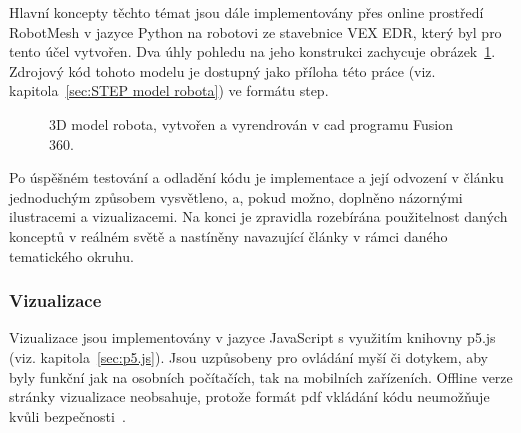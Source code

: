 \documentclass[a4paper, 12pt, twoside]{article}
\begin{document}
  Hlavní koncepty těchto témat jsou dále implementovány přes online prostředí RobotMesh v jazyce Python na robotovi ze stavebnice VEX EDR, který byl pro tento účel vytvořen. Dva úhly pohledu na jeho konstrukci zachycuje obrázek~\ref{img:3D model robota}. Zdrojový kód tohoto modelu je dostupný jako příloha této práce (viz. kapitola~\ref{sec:STEP model robota}) ve formátu \gls{step}.

  \begin{figure}[H]%
    \centering

    \hfill

    \caption[3D model robota]{3D model robota, vytvořen a vyrendrován v \gls{cad} programu Fusion 360.}%
    \label{img:3D model robota}%
  \end{figure}

  Po úspěšném testování a odladění kódu je implementace a její odvození v článku jednoduchým způsobem vysvětleno, a, pokud možno, doplněno názornými ilustracemi a vizualizacemi. Na konci je zpravidla rozebírána použitelnost daných konceptů v reálném světě a nastíněny navazující články v rámci daného tematického okruhu.


  \subsubsection{Vizualizace} \label{sec:Vizualizace}
  Vizualizace jsou implementovány v jazyce JavaScript s využitím knihovny p5.js (viz. kapitola~\ref{sec:p5.js}). Jsou uzpůsobeny pro ovládání myší či dotykem, aby byly funkční jak na osobních počítačích, tak na mobilních zařízeních. Offline verze stránky vizualizace neobsahuje, protože formát \gls{pdf} vkládání kódu neumožňuje kvůli bezpečnosti~\cite{history-of-pdf}.
\end{document}
